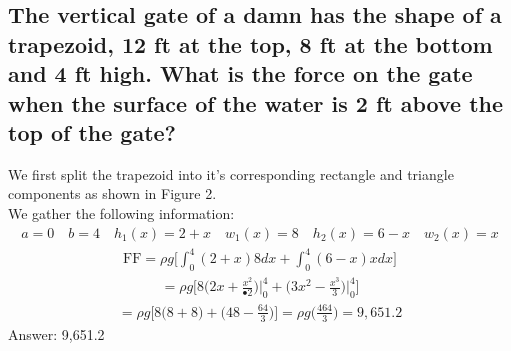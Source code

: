 \documentclass{article}
\begin{document}
\subsection{The vertical gate of a damn has the shape of a trapezoid, 12 ft at the top, 8 ft at the bottom and 4 ft high. What is the force on the gate when the surface of the water is 2 ft above the top of the gate?}
We first split the trapezoid into it's corresponding rectangle and triangle components as shown in Figure 2. \\[10pt]
We gather the following information:
\begin{align*}
	a = 0 \quad b = 4 \quad h_1(x) = 2 + x \quad w_1(x) = 8 \quad h_2(x) = 6 - x \quad w_2(x) = x
\end{align*}
\begin{align*}
	\text{FF} = \rho g \bigg[ \int_0^4 {(2 + x)8}dx + \int_0^4 {(6 - x)x}dx \bigg]
\end{align*}
\begin{align*}
	= \rho g \bigg[ 8 \bigg( 2x + \frac{x^2}{•2} \bigg) \bigg|_0^4 + \bigg(3x^2 - \frac{x^3}{3} \bigg) \bigg|_0^4 \bigg]
\end{align*}
\begin{align*}
	= \rho g \bigg[ 8 \bigg(8 + 8 \bigg) + \bigg(48 - \frac{64}{3} \bigg) \bigg] = \rho g \bigg(\frac{464}{3} \bigg) = 9,651.2
\end{align*}
Answer: 9,651.2

\end{document}
